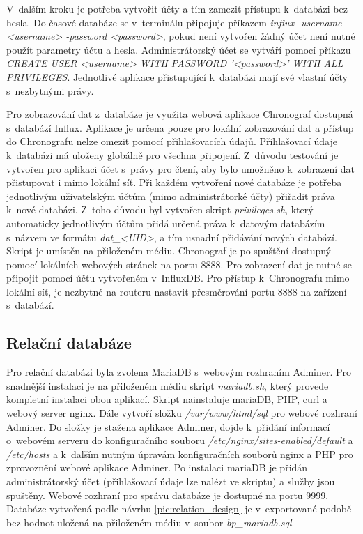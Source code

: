 V~dalším kroku je potřeba vytvořit účty a tím zamezit přístupu k~databázi bez hesla. Do časové databáze se v~terminálu připojuje příkazem \textit{influx -username <username> -password <password>}, pokud není vytvořen žádný účet není nutné použít parametry účtu a hesla. Administrátorský účet se vytváří pomocí příkazu \textit{CREATE USER <username> WITH PASSWORD '<password>' WITH ALL PRIVILEGES}. Jednotlivé aplikace přistupující k~databázi mají své vlastní účty s~nezbytnými právy. 

Pro zobrazování dat z~databáze je využita webová aplikace Chronograf dostupná s~databází Influx. Aplikace je určena pouze pro lokální zobrazování dat a přístup do Chronografu nelze omezit pomocí přihlašovacích údajů. Přihlašovací údaje k~databázi má uloženy globálně pro všechna připojení. Z~důvodu testování je vytvořen pro aplikaci účet s~právy pro čtení, aby bylo umožněno k~zobrazení dat přistupovat i mimo lokální síť. Při každém vytvoření nové databáze je potřeba jednotlivým uživatelským účtům (mimo administrátorké účty) přiřadit práva k~nové databázi. Z~toho důvodu byl vytvořen skript \textit{privileges.sh}, který automaticky jednotlivým účtům přidá určená práva k~datovým databázím s~názvem ve formátu \textit{dat\_<UID>}, a tím usnadní přidávání nových databází. Skript je umístěn na přiloženém médiu. Chronograf je po spuštění dostupný pomocí lokálních webových stránek na portu $8888$. Pro zobrazení dat je nutné se připojit pomocí účtu vytvořeném v~InfluxDB. Pro přístup k~Chronografu mimo lokální síť, je nezbytné na routeru nastavit přesměrování portu $8888$ na zařízení s~databází.

\subsection{Relační databáze}
Pro relační databázi byla zvolena MariaDB s~webovým rozhraním Adminer. Pro snadnější instalaci je na přiloženém médiu skript \textit{mariadb.sh}, který provede kompletní instalaci obou aplikací. Skript nainstaluje mariaDB, PHP, curl a webový server nginx. Dále vytvoří složku \textit{/var/www/html/sql} pro webové rozhraní Adminer. Do složky je stažena aplikace Adminer, dojde k~přidání informací o~webovém serveru do konfiguračního souboru \textit{/etc/nginx/sites-enabled/default} a \textit{/etc/hosts} a k~dalším nutným úpravám konfiguračních souborů nginx a PHP pro zprovoznění webové aplikace Adminer. Po instalaci mariaDB je přidán administrátorský účet (přihlašovací údaje lze nalézt ve skriptu) a služby jsou spuštěny. Webové rozhraní pro správu databáze je dostupné na portu $9999$. Databáze vytvořená podle návrhu \ref{pic:relation_design} je v~exportované podobě bez hodnot uložená na přiloženém médiu v~soubor \textit{bp\_mariadb.sql}.

